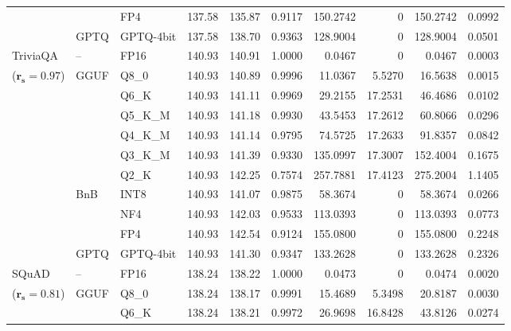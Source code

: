 \begin{longtable}{ll l rrrrrrr}
 &  & FP4 & 137.58 & 135.87 & \cellcolor{red!18} 0.9117 & \cellcolor{red!18} 150.2742 & \cellcolor{cyan!12} $0$ & \cellcolor{red!18} 150.2742 & \cellcolor{red!18} 0.0992 \\
 & GPTQ & GPTQ-4bit & 137.58 & 138.70 & \cellcolor{red!18} 0.9363 & \cellcolor{red!18} 128.9004 & \cellcolor{cyan!12} $0$ & \cellcolor{red!18} 128.9004 & \cellcolor{red!18} 0.0501 \\
\midrule
TriviaQA & -- & FP16 & 140.93 & 140.91 & 1.0000 & 0.0467 & \cellcolor{cyan!12} $0$ & 0.0467 & 0.0003 \\
{\small ($\mathbf{r_s{=}0.97}$)} & GGUF & Q8\_0 & 140.93 & 140.89 & 0.9996 & 11.0367 & 5.5270 & 16.5638 & 0.0015 \\
 &  & Q6\_K & 140.93 & 141.11 & 0.9969 & 29.2155 & 17.2531 & 46.4686 & 0.0102 \\
 &  & Q5\_K\_M & 140.93 & 141.18 & 0.9930 & 43.5453 & 17.2612 & 60.8066 & 0.0296 \\
 &  & Q4\_K\_M & 140.93 & 141.14 & 0.9795 & 74.5725 & 17.2633 & 91.8357 & 0.0842 \\
 &  & Q3\_K\_M & 140.93 & 141.39 & \cellcolor{red!18} 0.9330 & \cellcolor{red!18} 135.0997 & 17.3007 & \cellcolor{red!18} 152.4004 & \cellcolor{red!18} 0.1675 \\
 &  & Q2\_K & 140.93 & 142.25 & \cellcolor{red!35} 0.7574 & \cellcolor{red!35} 257.7881 & 17.4123 & \cellcolor{red!35} 275.2004 & \cellcolor{red!35} 1.1405 \\
 & BnB & INT8 & 140.93 & 141.07 & 0.9875 & 58.3674 & \cellcolor{cyan!12} $0$ & 58.3674 & 0.0266 \\
 &  & NF4 & 140.93 & 142.03 & 0.9533 & 113.0393 & \cellcolor{cyan!12} $0$ & 113.0393 & 0.0773 \\
 &  & FP4 & 140.93 & 142.54 & \cellcolor{red!18} 0.9124 & \cellcolor{red!18} 155.0800 & \cellcolor{cyan!12} $0$ & \cellcolor{red!18} 155.0800 & \cellcolor{red!18} 0.2248 \\
 & GPTQ & GPTQ-4bit & 140.93 & 141.30 & \cellcolor{red!18} 0.9347 & \cellcolor{red!18} 133.2628 & \cellcolor{cyan!12} $0$ & \cellcolor{red!18} 133.2628 & \cellcolor{red!18} 0.2326 \\
\midrule
SQuAD & -- & FP16 & 138.24 & 138.22 & 1.0000 & 0.0473 & \cellcolor{cyan!12} $0$ & 0.0474 & 0.0020 \\
{\small ($\mathbf{r_s{=}0.81}$)} & GGUF & Q8\_0 & 138.24 & 138.17 & 0.9991 & 15.4689 & 5.3498 & 20.8187 & 0.0030 \\
 &  & Q6\_K & 138.24 & 138.21 & 0.9972 & 26.9698 & 16.8428 & 43.8126 & 0.0274 \\

\end{longtable}
